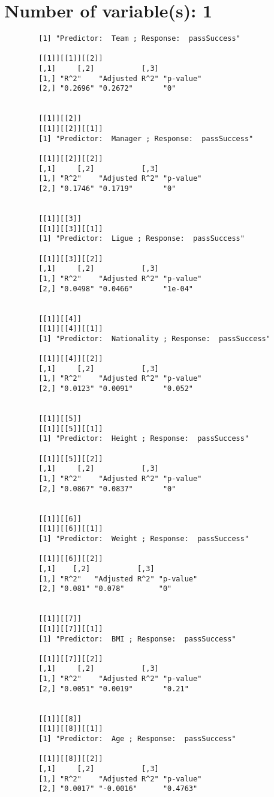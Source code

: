 \documentclass[12pt]{article}
\title{}
\author{}
\date{}
\begin{document}
	\section{Number of variable(s): 1}
	\begin{verbatim}
		[1] "Predictor:  Team ; Response:  passSuccess"
		
		[[1]][[1]][[2]]
		[,1]     [,2]           [,3]     
		[1,] "R^2"    "Adjusted R^2" "p-value"
		[2,] "0.2696" "0.2672"       "0"      
		
		
		[[1]][[2]]
		[[1]][[2]][[1]]
		[1] "Predictor:  Manager ; Response:  passSuccess"
		
		[[1]][[2]][[2]]
		[,1]     [,2]           [,3]     
		[1,] "R^2"    "Adjusted R^2" "p-value"
		[2,] "0.1746" "0.1719"       "0"      
		
		
		[[1]][[3]]
		[[1]][[3]][[1]]
		[1] "Predictor:  Ligue ; Response:  passSuccess"
		
		[[1]][[3]][[2]]
		[,1]     [,2]           [,3]     
		[1,] "R^2"    "Adjusted R^2" "p-value"
		[2,] "0.0498" "0.0466"       "1e-04"  
		
		
		[[1]][[4]]
		[[1]][[4]][[1]]
		[1] "Predictor:  Nationality ; Response:  passSuccess"
		
		[[1]][[4]][[2]]
		[,1]     [,2]           [,3]     
		[1,] "R^2"    "Adjusted R^2" "p-value"
		[2,] "0.0123" "0.0091"       "0.052"  
		
		
		[[1]][[5]]
		[[1]][[5]][[1]]
		[1] "Predictor:  Height ; Response:  passSuccess"
		
		[[1]][[5]][[2]]
		[,1]     [,2]           [,3]     
		[1,] "R^2"    "Adjusted R^2" "p-value"
		[2,] "0.0867" "0.0837"       "0"      
		
		
		[[1]][[6]]
		[[1]][[6]][[1]]
		[1] "Predictor:  Weight ; Response:  passSuccess"
		
		[[1]][[6]][[2]]
		[,1]    [,2]           [,3]     
		[1,] "R^2"   "Adjusted R^2" "p-value"
		[2,] "0.081" "0.078"        "0"      
		
		
		[[1]][[7]]
		[[1]][[7]][[1]]
		[1] "Predictor:  BMI ; Response:  passSuccess"
		
		[[1]][[7]][[2]]
		[,1]     [,2]           [,3]     
		[1,] "R^2"    "Adjusted R^2" "p-value"
		[2,] "0.0051" "0.0019"       "0.21"   
		
		
		[[1]][[8]]
		[[1]][[8]][[1]]
		[1] "Predictor:  Age ; Response:  passSuccess"
		
		[[1]][[8]][[2]]
		[,1]     [,2]           [,3]     
		[1,] "R^2"    "Adjusted R^2" "p-value"
		[2,] "0.0017" "-0.0016"      "0.4763" 
		

\end{verbatim}
\end{document}
